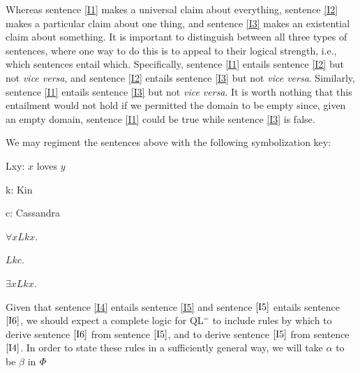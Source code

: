Whereas sentence \ref{I1} makes a universal claim about everything, sentence \ref{I2} makes a particular claim about one thing, and sentence \ref{I3} makes an existential claim about something.
It is important to distinguish between all three types of sentences, where one way to do this is to appeal to their logical strength, i.e., which sentences entail which.
Specifically, sentence \ref{I1} entails sentence \ref{I2} but not \textit{vice versa}, and sentence \ref{I2} entails sentence \ref{I3} but not \textit{vice versa}.
Similarly, sentence \ref{I1} entails sentence \ref{I3} but not \textit{vice versa}.
It is worth nothing that this entailment would not hold if we permitted the domain to be empty since, given an empty domain, sentence \ref{I1} could be true while sentence \ref{I3} is false.


We may regiment the sentences above with the following symbolization key:

\begin{multicols}{2}
  
\begin{ekey}
  \item[Lxy:] $x$ loves $y$ 
  \item[k:] Kin
  \item[c:] Cassandra
\end{ekey}

\begin{earg}
  \item[\ex{I4}] $\forall xLkx$.
  \item[\ex{I5}] $Lkc$.
  \item[\ex{I6}] $\exists xLkx$.
\end{earg}

\end{multicols}

Given that sentence \ref{I4} entails sentence \ref{I5} and sentence $\ref{I5}$ entails sentence $\ref{I6}$, we should expect a complete logic for QL$^=$ to include rules by which to derive sentence $\ref{I6}$ from sentence $\ref{I5}$, and to derive sentence $\ref{I5}$ from sentence $\ref{I4}$. 
In order to state these rules in a sufficiently general way, we will take $\alpha$ to be  $\beta$ in $\varPhi$ 



